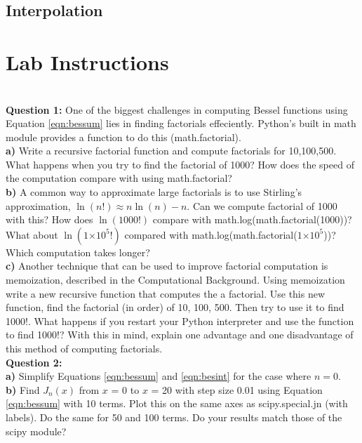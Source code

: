 \documentclass[a4paper,12pt]{article}
\providecommand{\e}[1]{\ensuremath{\times 10^{#1}}}
\begin{document}
\subsection{Interpolation}

\section{Lab Instructions}
\\
\textbf{Question 1:} One of the biggest challenges in computing Bessel functions using Equation \ref{eqn:bessum} lies in finding factorials effeciently. Python's built in math module provides a function to do this (math.factorial).\\
\textbf{a)} Write a recursive factorial function and compute factorials for 10,100,500. What happens when you try to find the factorial of 1000? How does the speed of the computation compare with using math.factorial?\\
\textbf{b)} A common way to approximate large factorials is to use Stirling's approximation, $\ln(n!) \approx n\ln(n) - n$. Can we compute factorial of 1000 with this? How does $\ln(1000!)$ compare with math.log(math.factorial(1000))? What about $\ln(1\e{5}!)$ compared with math.log(math.factorial($1\e{5}$))? Which computation takes longer?\\
\textbf{c)} Another technique that can be used to improve factorial computation is memoization, described in the Computational Background. Using memoization write a new recursive function that computes the a factorial. Use this new function, find the factorial (in order) of 10, 100, 500. Then try to use it to find 1000!. What happens if you restart your Python interpreter and use the function to find 1000!? With this in mind, explain one advantage and one disadvantage of this method of computing factorials. \\

\textbf{Question 2:} \\
\textbf{a)} Simplify Equations \ref{eqn:bessum} and \ref{eqn:besint} for the case where $n = 0$.\\
\textbf{b)} Find $J_n(x)$ from $x$ = 0 to $x$ = 20 with step size 0.01 using Equation \ref{eqn:bessum} with 10 terms. Plot this on the same axes as scipy.special.jn (with labels). Do the same for 50 and 100 terms. Do your results match those of the scipy module?\\
\end{document}
